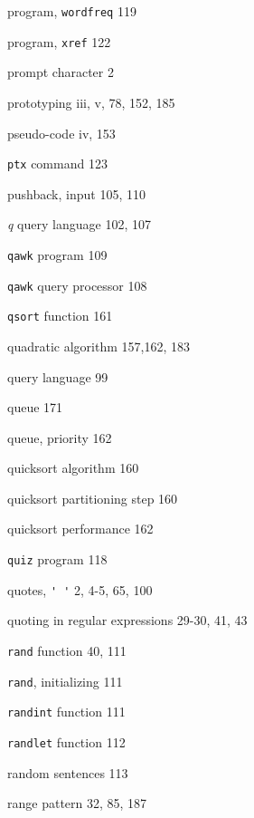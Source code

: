 \begin{multicols}{3}
\hangindent=4pc  program, \verb'wordfreq' 119

\hangindent=4pc  program, \verb'xref' 122

\hangindent=4pc  prompt character 2

\hangindent=4pc  prototyping iii, v, 78, 152, 185

\hangindent=4pc  pseudo-code iv, 153

\hangindent=4pc  \verb'ptx' command 123

\hangindent=4pc  pushback, input 105, 110

\hangindent=4pc  \textit{q} query language 102, 107

\hangindent=4pc  \verb'qawk' program 109

\hangindent=4pc  \verb'qawk' query processor 108

\hangindent=4pc  \verb'qsort' function 161

\hangindent=4pc  quadratic algorithm 157,162, 183

\hangindent=4pc  query language 99

\hangindent=4pc  queue 171

\hangindent=4pc  queue, priority 162

\hangindent=4pc  quicksort algorithm 160

\hangindent=4pc  quicksort partitioning step 160

\hangindent=4pc  quicksort performance 162

\hangindent=4pc  \verb'quiz' program 118

\hangindent=4pc  quotes, \verb"' '" 2, 4-5, 65, 100

\hangindent=4pc  quoting in regular expressions 29-30, 41, 43

\hangindent=4pc  \verb'rand' function 40, 111

\hangindent=4pc  \verb'rand', initializing 111

\hangindent=4pc  \verb'randint' function 111

\hangindent=4pc  \verb'randlet' function 112

\hangindent=4pc  random sentences 113

\hangindent=4pc  range pattern 32, 85, 187


\end{multicols}
